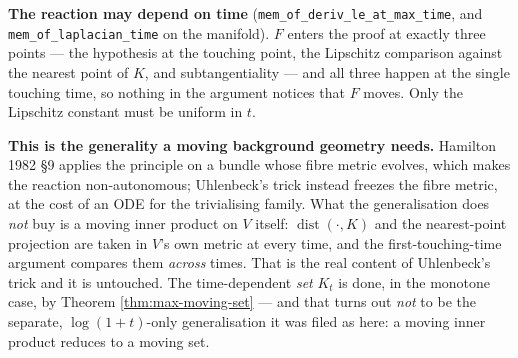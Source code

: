 \begin{theorem}
  \textbf{The reaction may depend on time} (\texttt{mem\_of\_deriv\_le\_at\_max\_time},
  and \texttt{mem\_of\_laplacian\_time} on the manifold). $F$ enters the proof at exactly
  three points --- the hypothesis at the touching point, the Lipschitz comparison against
  the nearest point of $K$, and subtangentiality --- and all three happen at the single
  touching time, so nothing in the argument notices that $F$ moves. Only the Lipschitz
  constant must be uniform in $t$.

  \textbf{This is the generality a moving background geometry needs.} Hamilton 1982 \S9
  applies the principle on a bundle whose fibre metric evolves, which makes the reaction
  non-autonomous; Uhlenbeck's trick instead freezes the fibre metric, at the cost of an ODE
  for the trivialising family. What the generalisation does \emph{not} buy is a moving inner
  product on $V$ itself: $\operatorname{dist}(\cdot, K)$ and the nearest-point projection are
  taken in $V$'s own metric at every time, and the first-touching-time argument compares them
  \emph{across} times. That is the real content of Uhlenbeck's trick and it is untouched.
  The time-dependent \emph{set} $K_t$ is done, in the monotone case, by Theorem
  \ref{thm:max-moving-set} --- and that turns out \emph{not} to be the separate,
  $\log(1+t)$-only generalisation it was filed as here: a moving inner product reduces to a
  moving set.
\end{theorem}

